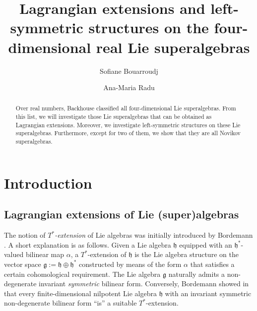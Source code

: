 \documentclass[12pt]{amsart}
\newcommand{\fg}{\mathfrak{g}}
\newcommand{\fh}{\mathfrak{h}}
\begin{document}
\title[Lagrangian extensions and  left-symmetric structures]{Lagrangian extensions and left-symmetric structures on the four-dimensional real Lie superalgebras}

\author{Sofiane Bouarroudj}
\address {Division of Science and Mathematics, New York University Abu Dhabi, P.O. Box 129188, Abu Dhabi, United Arab Emirates.}

\author{Ana-Maria Radu}





\begin{abstract} 
Over real numbers, Backhouse classified all four-dimensional Lie superalgebras. From this list, we  will investigate those Lie superalgebras that can be obtained as Lagrangian extensions. Moreover, we investigate left-symmetric structures on these Lie superalgebras. Furthermore, except for two of them, we show that they are all Novikov superalgebras. 

\end{abstract} 

\maketitle

\hspace{10pt}


\section{Introduction}

\subsection{Lagrangian extensions of Lie (super)algebras} The notion of {\it $T^*$-extension} of Lie algebras was initially introduced by Bordemann \cite{Bor}. A short explanation is as follows. Given a Lie algebra $\fh$ equipped with an $\fh^*$-valued bilinear map $\alpha$, a $T^*$-extension of $\fh$ is the Lie  algebra structure on the vector space  $\fg:=\fh\oplus \fh^*$ constructed by means of the form $\alpha$ that satisfies a certain cohomological requirement.  The Lie algebra $\fg$ naturally admits a non-degenerate invariant {\it symmetric} bilinear form.  Conversely, Bordemann showed in \cite{Bor} that every finite-dimensional nilpotent Lie algebra $\fh$ with an invariant symmetric non-degenerate bilinear form   ``is'' a suitable $T^*$-extension.
\end{document}
